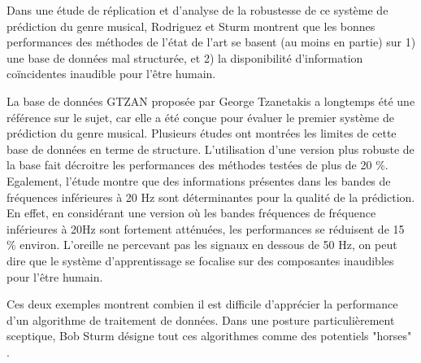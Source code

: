   Dans une étude de réplication et d'analyse de la robustesse de ce système de prédiction du genre musical\cite{rodriguez2016analysing}, Rodriguez et Sturm montrent que les bonnes performances des méthodes de l'état de l'art se basent (au moins en partie) sur 1) une base de données mal structurée, et 2) la disponibilité d'information coïncidentes inaudible pour l'être humain.

  La base de données GTZAN proposée par George Tzanetakis a longtemps été une référence sur le sujet, car elle a été conçue pour évaluer le premier système de prédiction du genre musical\cite{tzanetakis2002musical}. Plusieurs études ont montrées les limites de cette base de données en terme de structure. L'utilisation d'une version plus robuste de la base fait décroitre les performances des méthodes testées de plus de 20 \%. Egalement, l'étude montre que des informations présentes dans les bandes de fréquences inférieures à 20 Hz sont déterminantes pour la qualité de la prédiction. En effet, en considérant une version où les bandes fréquences de fréquence inférieures à 20Hz sont fortement atténuées, les performances se réduisent de 15 \% environ. L'oreille ne percevant pas les signaux en dessous de 50 Hz, on peut dire que le système d'apprentissage se focalise sur des composantes inaudibles pour l'être humain.

  Ces deux exemples montrent combien il est difficile d'apprécier la performance d'un algorithme de traitement de données. Dans une posture particulièrement sceptique, Bob Sturm désigne tout ces algorithmes comme des potentiels "horses"  .

